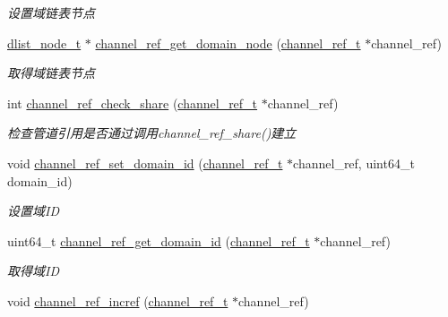 \begin{DoxyCompactItemize}
\begin{DoxyCompactList}\small\item\em 设置域链表节点 \end{DoxyCompactList}\item 
\hyperlink{a00047_a62053232bcf3566010ef98a7d77c3cc8_a62053232bcf3566010ef98a7d77c3cc8}{dlist\+\_\+node\+\_\+t} $\ast$ \hyperlink{a00045_ab5e94cb95124a4c5db7ddf5750a9bb17_ab5e94cb95124a4c5db7ddf5750a9bb17}{channel\+\_\+ref\+\_\+get\+\_\+domain\+\_\+node} (\hyperlink{a00047_a151271c9d188ef28d4d24bb81dcc1263_a151271c9d188ef28d4d24bb81dcc1263}{channel\+\_\+ref\+\_\+t} $\ast$channel\+\_\+ref)
\begin{DoxyCompactList}\small\item\em 取得域链表节点 \end{DoxyCompactList}\item 
int \hyperlink{a00045_ab71c6ed6109fedf4cf941b8de498a622_ab71c6ed6109fedf4cf941b8de498a622}{channel\+\_\+ref\+\_\+check\+\_\+share} (\hyperlink{a00047_a151271c9d188ef28d4d24bb81dcc1263_a151271c9d188ef28d4d24bb81dcc1263}{channel\+\_\+ref\+\_\+t} $\ast$channel\+\_\+ref)
\begin{DoxyCompactList}\small\item\em 检查管道引用是否通过调用channel\+\_\+ref\+\_\+share()建立 \end{DoxyCompactList}\item 
void \hyperlink{a00045_a66387736035e1c761a9ceebf3c33d9cf_a66387736035e1c761a9ceebf3c33d9cf}{channel\+\_\+ref\+\_\+set\+\_\+domain\+\_\+id} (\hyperlink{a00047_a151271c9d188ef28d4d24bb81dcc1263_a151271c9d188ef28d4d24bb81dcc1263}{channel\+\_\+ref\+\_\+t} $\ast$channel\+\_\+ref, uint64\+\_\+t domain\+\_\+id)
\begin{DoxyCompactList}\small\item\em 设置域\+I\+D \end{DoxyCompactList}\item 
uint64\+\_\+t \hyperlink{a00045_a8498a205a4580c25c337a33b571396f7_a8498a205a4580c25c337a33b571396f7}{channel\+\_\+ref\+\_\+get\+\_\+domain\+\_\+id} (\hyperlink{a00047_a151271c9d188ef28d4d24bb81dcc1263_a151271c9d188ef28d4d24bb81dcc1263}{channel\+\_\+ref\+\_\+t} $\ast$channel\+\_\+ref)
\begin{DoxyCompactList}\small\item\em 取得域\+I\+D \end{DoxyCompactList}\item 
void \hyperlink{a00045_aef059f673946f97e8b892b600f839af1_aef059f673946f97e8b892b600f839af1}{channel\+\_\+ref\+\_\+incref} (\hyperlink{a00047_a151271c9d188ef28d4d24bb81dcc1263_a151271c9d188ef28d4d24bb81dcc1263}{channel\+\_\+ref\+\_\+t} $\ast$channel\+\_\+ref)

\end{DoxyCompactItemize}
